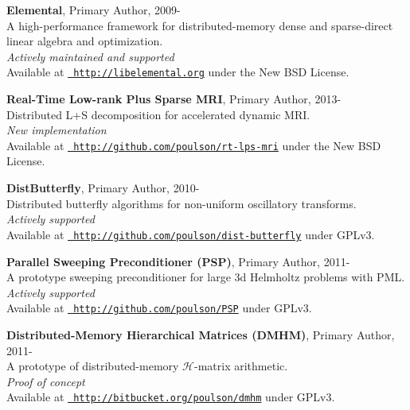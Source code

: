 \documentclass[letterpaper]{article}
\renewenvironment{itemize}{
  \begin{list}{}{
    \setlength{\leftmargin}{1.5em}
  }
}{
  \end{list}
}
\begin{document}
\begin{itemize}
\item {\bf Elemental}, Primary Author, 2009-\\
A high-performance framework for distributed-memory dense and sparse-direct linear algebra and optimization.\\ 
{\it Actively maintained and supported}\\
Available at 
\href{http://libelemental.org}{\tt 
      http://libelemental.org} under the New BSD License.

\item {\bf Real-Time Low-rank Plus Sparse MRI}, Primary Author, 2013-\\
Distributed L+S decomposition for accelerated dynamic MRI.\\ 
{\it New implementation}\\
Available at
\href{http://github.com/poulson/rt-lps-mri}{\tt
      http://github.com/poulson/rt-lps-mri} under the New BSD License.

\item {\bf DistButterfly}, Primary Author, 2010-\\
Distributed butterfly algorithms for non-uniform oscillatory transforms.\\
{\it Actively supported}\\
Available at
\href{http://github.com/poulson/dist-butterfly}{\tt
      http://github.com/poulson/dist-butterfly} under GPLv3.

\item {\bf Parallel Sweeping Preconditioner (PSP)}, Primary Author, 2011-\\
A prototype sweeping preconditioner for large 3d Helmholtz problems with  PML.\\
{\it Actively supported}\\
Available at
\href{http://github.com/poulson/PSP}{\tt
      http://github.com/poulson/PSP} under GPLv3.

\item {\bf Distributed-Memory Hierarchical Matrices (DMHM)}, Primary Author, 2011-\\
A prototype of distributed-memory $\mathcal{H}$-matrix arithmetic. \\
{\it Proof of concept}\\
Available at
\href{http://bitbucket.org/poulson/dmhm}{\tt
      http://bitbucket.org/poulson/dmhm} under GPLv3.


\end{itemize}
\end{document}
